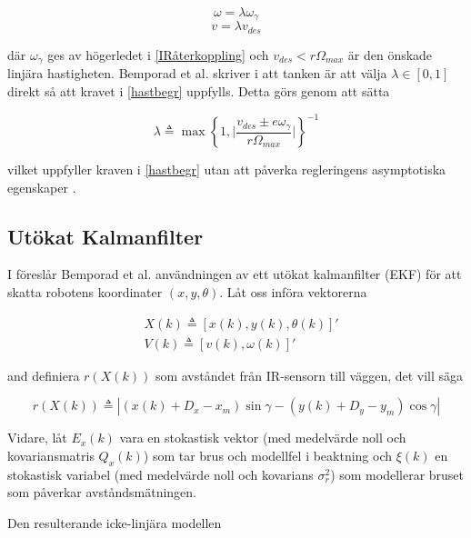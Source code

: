 \documentclass[11pt]{article}
\begin{document}
\begin{flushleft}
\begin{equation}
	\omega = \lambda \omega_\gamma
\end{equation}
\begin{equation}
	v = \lambda v_{des}
\end{equation}

där $\omega_\gamma$ ges av högerledet i \eqref{IRåterkoppling} och $v_{des} < r \Omega_{max}$ är den önskade linjära hastigheten. Bemporad et al. skriver i \cite{wfp} att tanken är att välja $\lambda \in [0,1]$ direkt så att kravet i \eqref{hastbegr} uppfylls. Detta görs genom att sätta

\begin{equation}\label{haståterkoppling}
	\lambda \triangleq \max{\left\{ 1, \bigg| \frac {v_{des} \pm e \omega_\gamma} {r \Omega_{max}} \bigg|  \right\}}^{-1}
\end{equation}

vilket uppfyller kraven i \eqref{hastbegr} utan att påverka regleringens asymptotiska egenskaper \cite{wfp}.

\subsection{Utökat Kalmanfilter}
I \cite{wfp} föreslår Bemporad et al. användningen av ett utökat kalmanfilter (EKF) för att skatta robotens koordinater $(x,y,\theta)$. Låt oss införa vektorerna 

\begin{equation*}
	\begin{aligned}
	&X(k) \triangleq [x(k), y(k), \theta(k)]' \\
	&V(k) \triangleq [v(k), \omega(k)]'
	\end{aligned}
\end{equation*}

and definiera $r(X(k))$ som avståndet från IR-sensorn till väggen, det vill säga

\begin{equation*}
	r(X(k)) \triangleq | (x(k) + D_x - x_m) \sin \gamma - (y(k) + D_y - y_m) \cos \gamma |
\end{equation*}

Vidare, låt $E_x(k)$ vara en stokastisk vektor (med medelvärde noll och kovariansmatris $Q_x(k)$) som tar brus och modellfel i beaktning och $\xi(k)$ en stokastisk variabel (med medelvärde noll och kovarians $\sigma_r^2$) som modellerar bruset som påverkar avståndsmätningen.

Den resulterande icke-linjära modellen 


\end{flushleft}
\end{document}
